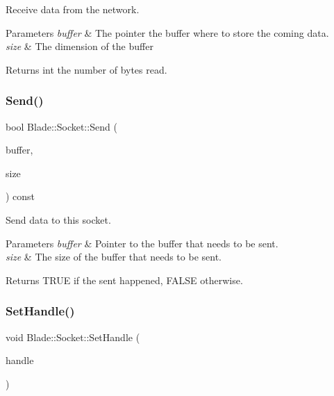 Receive data from the network. 


\begin{DoxyParams}{Parameters}
{\em buffer} & The pointer the buffer where to store the coming data. \\
\hline
{\em size} & The dimension of the buffer \\
\hline
\end{DoxyParams}
\begin{DoxyReturn}{Returns}
int the number of bytes read. 
\end{DoxyReturn}
\mbox{\label{class_blade_1_1_socket_a619058cf7a937e45aa0d4e50971bde24}} 
\subsubsection{\texorpdfstring{Send()}{Send()}}
{\footnotesize\ttfamily bool Blade\+::\+Socket\+::\+Send (\begin{DoxyParamCaption}\item[{const char $\ast$}]{buffer,  }\item[{int}]{size }\end{DoxyParamCaption}) const\hspace{0.3cm}{\ttfamily [noexcept]}}



Send data to this socket. 


\begin{DoxyParams}{Parameters}
{\em buffer} & Pointer to the buffer that needs to be sent. \\
\hline
{\em size} & The size of the buffer that needs to be sent. \\
\hline
\end{DoxyParams}
\begin{DoxyReturn}{Returns}
T\+R\+UE if the sent happened, F\+A\+L\+SE otherwise. 
\end{DoxyReturn}
\mbox{\label{class_blade_1_1_socket_adb437f4e6ee09e6bcaf6b48d536e504e}} 
\subsubsection{\texorpdfstring{Set\+Handle()}{SetHandle()}}
{\footnotesize\ttfamily void Blade\+::\+Socket\+::\+Set\+Handle (\begin{DoxyParamCaption}\item[{Socket\+Handle}]{handle }\end{DoxyParamCaption})\hspace{0.3cm}{\ttfamily [noexcept]}}



